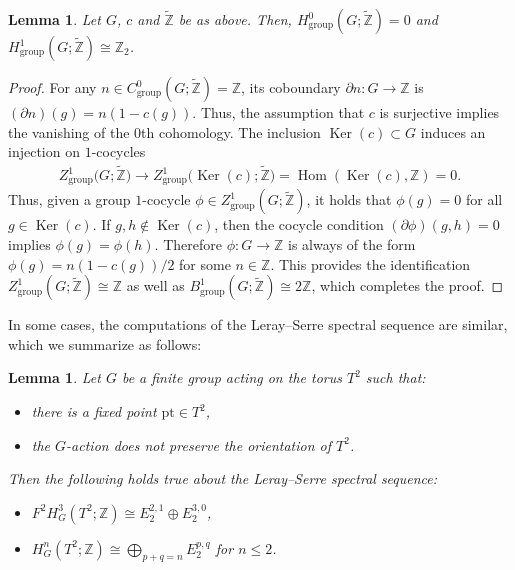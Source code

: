 \documentclass[pdftex]{sigma}
\newtheorem{lem}[thm]{Lemma}
\theoremstyle{definition}
\newcommand{\Z}{\mathbb{Z}}
\newcommand{\pt}{\mathrm{pt}}
\begin{document}
\begin{lem} \label{lem:group_coh_orientation_coeff}
Let $G$, $c$ and $\tilde{\Z}$ be as above. Then, $H^0_{\mathrm{group}}(G; \tilde{\Z}) = 0$ and $H^1_{\mathrm{group}}(G; \tilde{\Z}) \cong \Z_2$.
\end{lem}

\begin{proof}For any $n \in C^0_{\mathrm{group}}(G; \tilde{\Z}) = \Z$, its coboundary $\partial n\colon G \to \Z$ is $(\partial n)(g) = n(1 - c(g))$. Thus, the assumption that $c$ is surjective implies the vanishing of the $0$th cohomology. The inclusion $\operatorname{Ker}(c) \subset G$ induces an injection on $1$-cocycles
\begin{gather*}
Z^1_{\mathrm{group}}\big(G; \tilde{\Z}\big) \to Z^1_{\mathrm{group}}\big(\operatorname{Ker}(c); \tilde{\Z}\big) = \operatorname{Hom}(\operatorname{Ker}(c), \Z) = 0.
\end{gather*}
Thus, given a group $1$-cocycle $\phi \in Z^1_{\mathrm{group}}(G; \tilde{\Z})$, it holds that $\phi(g) = 0$ for all $g \in \operatorname{Ker}(c)$. If $g, h \not\in \operatorname{Ker}(c)$, then the cocycle condition $(\partial \phi)(g, h) = 0$ implies $\phi(g) = \phi(h)$. Therefore $\phi \colon G \to \Z$ is always of the form $\phi(g) = n (1 - c(g))/2$ for some $n \in \Z$. This provides the identif\/ication $Z^1_{\mathrm{group}}(G; \tilde{\Z}) \cong \Z$ as well as $B^1_{\mathrm{group}}(G; \tilde{\Z}) \cong 2\Z$, which completes the proof.
\end{proof}

In some cases, the computations of the Leray--Serre spectral sequence are similar, which we summarize as follows:

\begin{lem} \label{lem:typical_argument_non_orientation_preserving_case}
Let $G$ be a finite group acting on the torus $T^2$ such that:
\begin{itemize}\itemsep=0pt
\item there is a fixed point $\pt \in T^2$,

\item the $G$-action does not preserve the orientation of $T^2$.
\end{itemize}
Then the following holds true about the Leray--Serre spectral sequence:
\begin{itemize}\itemsep=0pt
\item[$(a)$] $F^2H^3_G(T^2; \Z) \cong E_2^{2, 1} \oplus E_2^{3, 0}$,

\item[$(b)$] $H^n_G(T^2; \Z) \cong \bigoplus_{p + q = n} E_2^{p, q}$ for $n \le 2$.
\end{itemize}
\end{lem}
\end{document}
